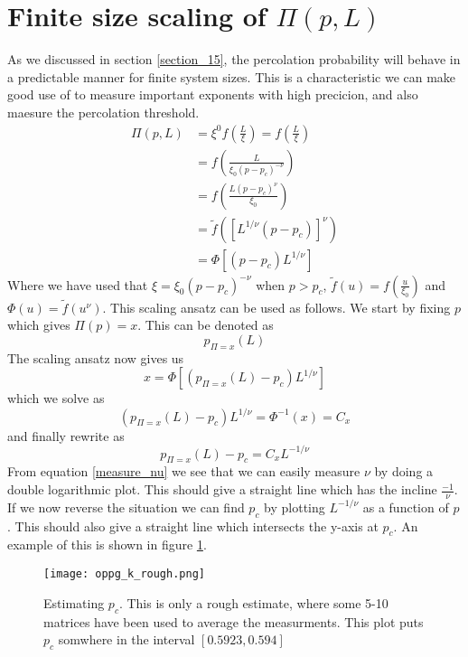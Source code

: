 \documentclass[a4paper,english, 10pt, twoside]{article}
\begin{document}
\section{Finite size scaling of $\Pi(p,L)$}
As we discussed in section \ref{section_15}, the percolation probability will behave in a predictable manner for finite 
system sizes. This is a characteristic we can make good use of to measure important exponents with high precicion, and also 
maesure the percolation threshold.
\begin{align*}
 \Pi(p,L) &= \xi^0f\left(\frac{L}{\xi}\right) = f\left(\frac{L}{\xi}\right)\\
 &= f\left(\frac{L}{\xi_0(p-p_c)^{-\nu}}\right)\\
 &= f\left(\frac{L(p-p_c)^\nu}{\xi_0}\right)\\
  &= \tilde{f}\left(\left[L^{1/\nu}(p-p_c)\right]^\nu\right)\\
  &= \Phi\left[\left(p-p_c\right)L^{1/\nu}\right]
\end{align*}
Where we have used that $\xi = \xi_0(p-p_c)^{-\nu}$ when $p>p_c$, $\tilde{f}(u) = f\left(\frac{u}{\xi_0}\right)$ and $\Phi(u)
= \tilde{f}(u^\nu)$. This scaling ansatz can be used as follows. We start by fixing $p$ which gives $\Pi(p) = x$. This can be 
denoted as 
\begin{equation}
 p_{\Pi=x}\left(L\right)
\end{equation}
The scaling ansatz now gives us
\begin{equation}
 x = \Phi\left[\left( p_{\Pi=x}\left(L\right)-p_c\right)L^{1/\nu}\right]
\end{equation}
which we solve as 
$$
\left(p_{\Pi=x}\left(L\right)-p_c\right)L^{1/\nu} = \Phi^{-1}(x) = C_x
$$
and finally rewrite as
\begin{equation}\label{measure_nu}
 p_{\Pi=x}\left(L\right)-p_c = C_xL^{-1/\nu}
\end{equation}
From equation \ref{measure_nu} we see that we can easily measure $\nu$ by doing a double logarithmic plot. This should give a 
straight line which has the incline $\frac{-1}{\nu}$. \\
If we now reverse the situation we can find $p_c$ by plotting $L^{-1/\nu}$ as a function of $p$. This should also give a straight 
line which intersects the y-axis at $p_c$. An example of this is shown in figure \ref{measure_pc}.
\begin{figure}[H]
\centering
\texttt{[image: oppg\_k\_rough.png]}
\caption{Estimating $p_c$. This is only a rough estimate, where some 5-10 matrices have been used to average the measurments. 
This plot puts $p_c$ somwhere in the interval $[0.5923, 0.594]$}
\label{measure_pc}
\end{figure}
\end{document}
